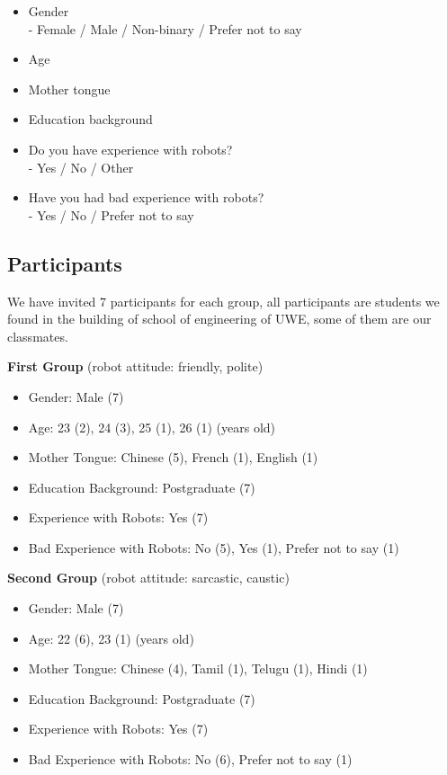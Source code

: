 \documentclass[conference]{IEEEtran}
\begin{document}
\begin{itemize}
    \item Gender
    \\ - Female / Male / Non-binary / Prefer not to say
    \item Age
    \item Mother tongue
    \item Education background
    \item Do you have experience with robots?
    \\ - Yes / No / Other
    \item Have you had bad experience with robots?
    \\ - Yes / No / Prefer not to say
    
\end{itemize}

\subsection{Participants}


We have invited 7 participants for each group, all participants are students we found in the building of school of engineering of UWE, some of them are our classmates.


\textbf{First Group} (robot attitude: friendly, polite)
\begin{itemize}
    \item Gender: Male (7)
    \item Age: 23 (2), 24 (3), 25 (1), 26 (1) (years old)
    \item Mother Tongue: Chinese (5), French (1), English (1)
    \item Education Background: Postgraduate (7)
    \item Experience with Robots: Yes (7)
    \item Bad Experience with Robots: No (5), Yes (1), Prefer not to say (1)
\end{itemize}

\textbf{Second Group} (robot attitude: sarcastic, caustic)
\begin{itemize}
    \item Gender: Male (7)
    \item Age: 22 (6), 23 (1) (years old)
    \item Mother Tongue: Chinese (4), Tamil (1), Telugu (1), Hindi (1)
    \item Education Background: Postgraduate (7)
    \item Experience with Robots: Yes (7)
    \item Bad Experience with Robots: No (6), Prefer not to say (1)
\end{itemize}
\end{document}

